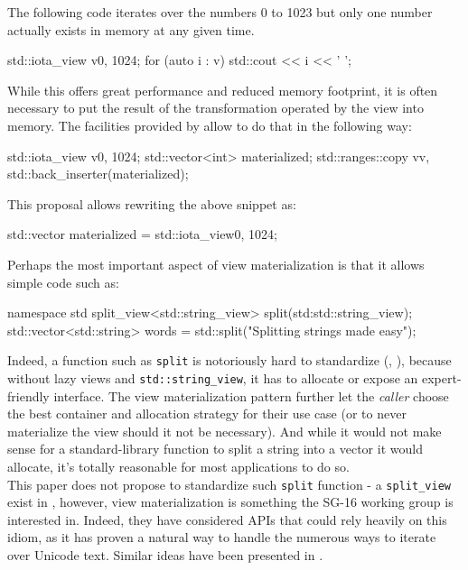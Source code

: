 \documentclass{wg21}
\newcommand{\cc}[1]{\texttt{#1}}
\begin{document}
The following code iterates over the numbers 0 to 1023 but only one number actually exists in memory at any given time.
\begin{codeblock}
std::iota_view v{0, 1024};
for (auto i : v) {
    std::cout << i << ' ';
}
\end{codeblock}

While this offers great performance and reduced memory footprint, it is often necessary to put the result of the transformation operated by the view into memory.
The facilities provided by \cite{P0896R3} allow to do that in the following way:


\begin{codeblock}
    std::iota_view v{0, 1024};
    std::vector<int> materialized;
    std::ranges::copy v{v, std::back_inserter(materialized)};
\end{codeblock}

This proposal allows rewriting the above snippet as:

\begin{codeblock}
    std::vector materialized = std::iota_view{0, 1024};
\end{codeblock}


Perhaps the most important aspect of view materialization is that it allows simple code such as:

\begin{codeblock}
    namespace std {
        split_view<std::string_view> split(std:std::string_view);
    }
    std::vector<std::string> words = std::split("Splitting strings made easy");
\end{codeblock}

Indeed, a function such as \cc{split} is notoriously hard to standardize (\cite{P0540},  \cite{N3593}), because without lazy views and \cc{std::string_view}, it has to allocate or expose an expert-friendly interface.
The view materialization pattern further let the \emph{caller} choose the best container and allocation strategy for their use case (or to never materialize the view should it not be necessary).
And while it would not make sense for a standard-library function to split a string into a vector it would allocate, it's totally reasonable for most applications to do so.\\

This paper does not propose to standardize such \cc{split} function - a \cc{split_view} exist in \cite{P0896R3}, however, view materialization is something the SG-16 working group is interested in.
Indeed, they have considered APIs that could rely heavily on this idiom, as it has proven a natural way to handle the numerous ways to iterate over Unicode text.
Similar ideas have been presented in \cite{P1004}.
\end{document}
